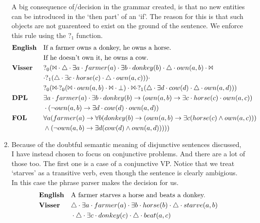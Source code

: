 \documentclass[12pt]{article}
\begin{document}
\begin{enumerate}
A big consequence of/decision in the grammar created, is that no new entities can be introduced in the `then part' of an `if'. The reason for this is that such objects are not guarenteed to exist on the ground of the sentence. We enforce this rule using the $?_1$ function.
\begin{align*}
&\text{\textbf{English}}&&\text{If a farmer owns a donkey, he owns a horse.}\\&&&\text{If he doesn't own it, he owns a cow.} \\
&\text{\textbf{Visser}}&&?_0(\Bowtie \cdot \triangle \cdot \exists a \cdot farmer(a) \cdot \exists b \cdot donkey(b) \cdot \triangle \cdot own(a,b) \cdot \Bowtie\\&&&\cdot ?_1(\triangle \cdot \exists c \cdot horse(c) \cdot \triangle \cdot own(a,c))) \cdot\\&&& ?_0(\Bowtie\cdot ?_0(\Bowtie \cdot own(a,b) \cdot \Bowtie \cdot \bot) \cdot \Bowtie \cdot ?_1(\triangle \cdot \exists d \cdot cow(d) \cdot \triangle \cdot own(a,d))) \\
&\text{\textbf{DPL}}&&\exists a \cdot farmer(a) \cdot \exists b \cdot donkey(b) \rightarrow (own(a,b) \rightarrow \exists c \cdot horse(c) \cdot own(a,c))\\&&& \cdot (\neg own(a,b) \rightarrow \exists d \cdot cow(d) \cdot own(a,d)) \\
&\text{\textbf{FOL}}&&\forall a(farmer(a) \rightarrow \forall b(donkey(b) \rightarrow (own(a,b) \rightarrow \exists c(horse(c) \wedge own(a,c)))\\&&&\wedge (\neg own(a,b) \rightarrow \exists d(cow(d) \wedge own(a,d))))) \\
\end{align*}
\item
Because of the doubtful semantic meaning of disjunctive sentences discussed, I have instead chosen to focus on conjunctive problems. And there are a lot of those too. The first one is a case of a conjunctive VP.
Notice that we treat `starves' as a transitive verb, even though the sentence is clearly ambigious. In this case the phrase parser makes the decision for us.
\begin{align*}
&\text{\textbf{English}}&&\text{A farmer starves a horse and beats a donkey.} \\
&\text{\textbf{Visser}}&&\triangle \cdot \exists a \cdot farmer(a) \cdot  \exists b \cdot horse(b) \cdot \triangle \cdot starve(a,b)\\&&&\cdot \triangle \cdot \exists c \cdot donkey(c) \cdot \triangle \cdot beat(a,c) \\

\end{align*}
\end{enumerate}
\end{document}
